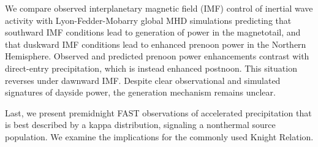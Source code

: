 We compare observed interplanetary magnetic field (IMF) control of inertial
\Alf wave activity with Lyon-Fedder-Mobarry global MHD simulations predicting
that southward IMF conditions lead to generation of \Alfic power in the
magnetotail, and that duskward IMF conditions lead to enhanced prenoon \Alfic
power in the Northern Hemisphere. Observed and predicted prenoon \Alfic power
enhancements contrast with direct-entry precipitation, which is instead enhanced
postnoon. This situation reverses under dawnward IMF. Despite clear
observational and simulated signatures of dayside \Alfic power, the generation
mechanism remains unclear.

Last, we present premidnight FAST observations of accelerated precipitation that
is best described by a kappa distribution, signaling a nonthermal source
population. We examine the implications for the commonly used Knight Relation.




